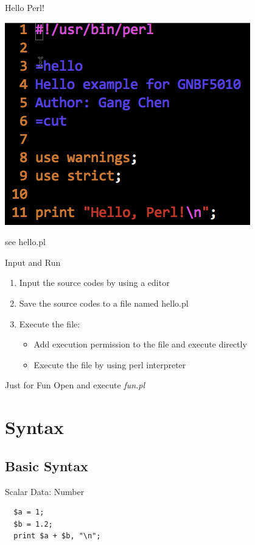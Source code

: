 \documentclass[UTF8]{beamer}
\begin{document}
\begin{frame}[t]{Hello Perl!}
  \centerline{\includegraphics[height=.6\textheight]{hello.png}}
  see hello.pl
\end{frame}

\begin{frame}[t]{Input and Run}
  \begin{enumerate}
    \item Input the source codes by using a editor
    \item Save the source codes to a file named hello.pl
    \item Execute the file:
    \begin{itemize}
      \item Add execution permission to the file and execute directly
      \item Execute the file by using perl interpreter
    \end{itemize}
  \end{enumerate}
\end{frame}

\begin{frame}[t]{Just for Fun}
    Open and execute \textit{fun.pl}
\end{frame}

\section{Syntax}

\subsection{Basic Syntax}
\begin{frame}[fragile]{Scalar Data: Number}
\begin{verbatim}
  $a = 1;
  $b = 1.2;
  print $a + $b, "\n";
\end{verbatim}
\end{frame}
\end{document}
